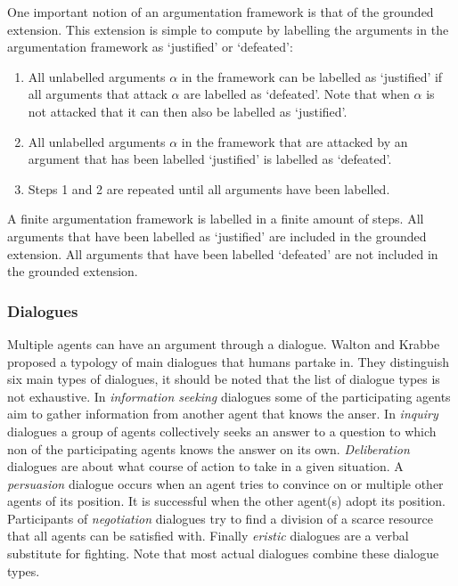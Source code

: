 One important notion of an argumentation framework is that of the grounded
extension. This extension is simple to compute by labelling the arguments in
the argumentation framework as `justified' or `defeated':
\begin{enumerate}
	\item All unlabelled arguments $\alpha$ in the framework can be labelled as
	`justified' if all arguments that attack $\alpha$ are labelled as
	`defeated'. Note that when $\alpha$ is not attacked that it can then also
	be labelled as `justified'.
	\item All unlabelled arguments $\alpha$ in the framework that are attacked
	by an argument that has been labelled `justified' is labelled as `defeated'.
	\item Steps 1 and 2 are repeated until all arguments have been labelled.
\end{enumerate}
A finite argumentation framework is labelled in a finite amount of steps. All
arguments that have been labelled as `justified' are included in the grounded
extension. All arguments that have been labelled `defeated' are not included in
the grounded extension.

\subsubsection{Dialogues}
Multiple agents can have an argument through a dialogue. Walton and
Krabbe \cite{walton1995} proposed a typology of main dialogues that humans
partake in. They distinguish six main types of dialogues, it should be noted
that the list of dialogue types is not exhaustive. In \emph{information
seeking} dialogues some of the participating agents aim to gather information
from another agent that knows the anser. In \emph{inquiry} dialogues a group of
agents collectively seeks an answer to a question to which non of the
participating agents knows the answer on its own. \emph{Deliberation} dialogues
are about what course of action to take in a given situation. A
\emph{persuasion} dialogue occurs when an agent tries to convince on or
multiple other agents of its position. It is successful when the other agent(s)
adopt its position. Participants of \emph{negotiation} dialogues try to find a
division of a scarce resource that all agents can be satisfied with. Finally
\emph{eristic} dialogues are a verbal substitute for fighting. Note that most
actual dialogues combine these dialogue types.

